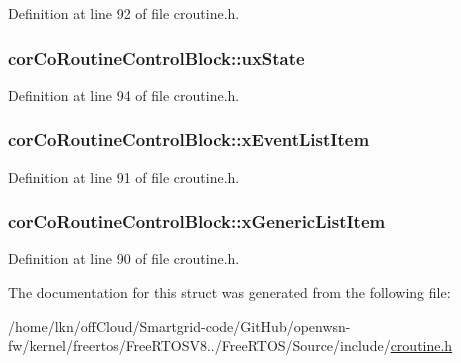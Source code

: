 Definition at line 92 of file croutine.\+h.

\subsubsection[{\texorpdfstring{ux\+State}{uxState}}]{ cor\+Co\+Routine\+Control\+Block\+::ux\+State}\hypertarget{structcor_co_routine_control_block_aa0d702ff5a23c61598fe13e5a78fb1dc}{}\label{structcor_co_routine_control_block_aa0d702ff5a23c61598fe13e5a78fb1dc}


Definition at line 94 of file croutine.\+h.

\subsubsection[{\texorpdfstring{x\+Event\+List\+Item}{xEventListItem}}]{ cor\+Co\+Routine\+Control\+Block\+::x\+Event\+List\+Item}\hypertarget{structcor_co_routine_control_block_a105d316da0069f766acc3b210afed1b9}{}\label{structcor_co_routine_control_block_a105d316da0069f766acc3b210afed1b9}


Definition at line 91 of file croutine.\+h.

\subsubsection[{\texorpdfstring{x\+Generic\+List\+Item}{xGenericListItem}}]{ cor\+Co\+Routine\+Control\+Block\+::x\+Generic\+List\+Item}\hypertarget{structcor_co_routine_control_block_aa2900494db8782eeb8ef12d482501406}{}\label{structcor_co_routine_control_block_aa2900494db8782eeb8ef12d482501406}


Definition at line 90 of file croutine.\+h.



The documentation for this struct was generated from the following file\+:\begin{DoxyCompactItemize}
\item 
/home/lkn/off\+Cloud/\+Smartgrid-\/code/\+Git\+Hub/openwsn-\/fw/kernel/freertos/\+Free\+R\+T\+O\+S\+V8../\+Free\+R\+T\+O\+S/\+Source/include/\hyperlink{croutine_8h}{croutine.\+h}\end{DoxyCompactItemize}
